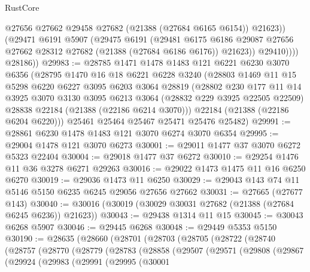 \begin{lexlean}{RustCore}
\begin{coremodule}
                  @27656
                  @27662
                  @29458
                  @27682
                  (@21388 (@27684 @6165 @6154))
                  @21623))
              (@29471
                @6191
                @5907
                (@29475
                  @6191
                  (@29481
                    @6175
                    @6186
                    @29087
                    @27656
                    @27662
                    @28312
                    @27682
                    (@21388 (@27684 @6186 @6176))
                    @21623))
                @29410))))
        @28186))
@29983 := @28785
    @1471
    @1478
    @1483
    @121
    @6221
    @6230
    @3070
    @6356
    (@28795
      @1470
      @16
      @18
      @6221
      @6228
      @3240
      (@28803
        @1469
        @11
        @15
        @5298
        @6220
        @6227
        @3095
        @6203
        @3064
        @28819
        (@28802
          @230
          @177
          @11
          @14
          @3925
          @3070
          @3130
          @3095
          @6213
          @3064
          (@28832 @229 @3925 @22505 @22509)
          @28838
          @22184
          (@21388 (@22186 @6214 @3070)))
        @22184
        (@21388 (@22186 @6204 @6220)))
      @25461
      @25464
      @25467
      @25471
      @25476
      @25482)
@29991 := @28861 @6230 @1478 @1483 @121 @3070 @6274 @3070 @6354
@29995 := @29004 @1478 @121 @3070 @6273
@30001 := @29011 @1477 @37 @3070 @6272 @5323 @22404
@30004 := @29018 @1477 @37 @6272
@30010 := @29254 @1476 @11 @36 @3278 @6271 @29263
@30016 := @29022 @1473 @1475 @11 @16 @6250 @6270
@30019 := @29036 @1473 @11 @6250
@30029 := @29043 @143 @74 @11 @5146 @5150 @6235 @6245 @29056 @27656 @27662
@30031 := @27665 (@27677 @143)
@30040 := @30016 (@30019 (@30029 @30031 @27682 (@21388 (@27684 @6245 @6236)) @21623))
@30043 := @29438 @1314 @11 @15
@30045 := @30043 @6268 @5907
@30046 := @29445 @6268
@30048 := @29449 @5353 @5150
@30190 := @28635
    (@28660
      (@28701
        (@28703
          (@28705
            (@28722
              (@28740
                (@28757
                  (@28770
                    (@28779
                      (@28783
                        (@28858
                          (@29507
                            (@29571
                              (@29808
                                (@29867
                                  (@29924
                                    (@29983
                                      (@29991
                                        (@29995
                                          (@30001

\end{coremodule}
\end{lexlean}
